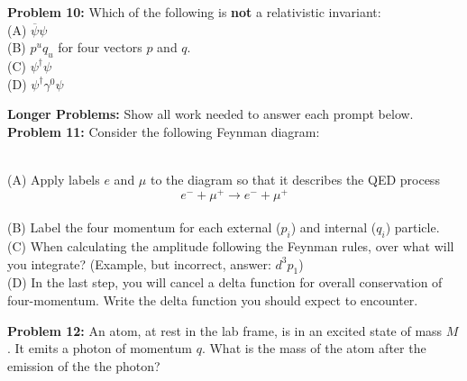 \documentclass[12pt]{article}
\begin{document}
\noindent
{\bf Problem 10:} Which of the following is {\bf not} a relativistic invariant:\\[5pt]
(A) $\overline{\psi}\psi$\\[5pt]
(B) $p^u q_u$ for four vectors $p$ and $q$.\\[5pt]
(C) $\psi^\dagger \psi$\\[5pt]
(D) $\psi^\dagger \gamma^0 \psi$\\[10pt]

\newpage

\noindent
{\bf Longer Problems:} Show all work needed to answer each prompt below.\\[5pt]  

\noindent
{\bf Problem 11:} Consider the following Feynman diagram:\\[5pt]
\begin{center}
\begin{feynman}
\end{feynman}
\end{center}
~\\[5pt]
\noindent
(A) Apply labels $e$ and $\mu$ to the diagram so that it describes the QED process
$$e^- + \mu^+ \to e^- + \mu^+$$\\[5pt]
(B) Label the four momentum for each external ($p_i$) and internal ($q_i$) particle.\\[5pt]
(C) When calculating the amplitude following the Feynman rules, over what will you integrate?  (Example, but incorrect, answer:  $d^3p_1$)\\[5pt]
(D) In the last step, you will cancel a delta function for overall conservation of four-momentum.  Write the delta function you should expect to encounter.

\newpage

\noindent
{\bf Problem 12:} An atom, at rest in the lab frame, is in an excited state of mass $M$.  It emits a photon of momentum $q$.  What is the mass of the atom after the emission of the the photon?

\newpage
\end{document}
